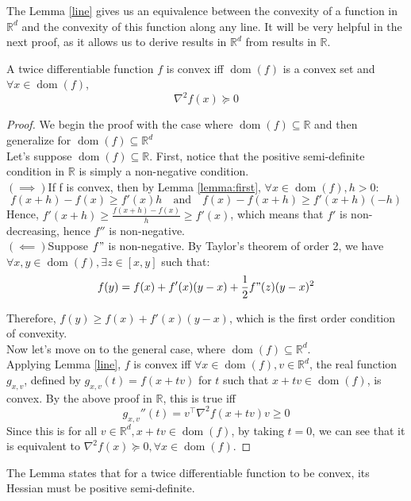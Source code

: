 \documentclass{article}
\DeclareMathOperator*{\dom}{dom}
\newcommand{\R}{\mathbb{R}}
\begin{document}
The Lemma \ref{line} gives us an equivalence between the convexity of a function in $\R^d$ and the convexity of this function along any line. It will be very helpful in the next proof, as it allows us to derive results in $\R^d$ from results in $\R$.\\

\begin{lemma}\label{second}
A twice differentiable function $f$ is convex iff $\dom(f)$ is a convex set and $\forall x\in\dom(f)$,
\[
\nabla^{2}f(x)\succeq 0
\]
\end{lemma}

\begin{proof}\cite{hall2016}
We begin the proof with the case where $\dom(f)\subseteq\R$ and then generalize for $\dom(f)\subseteq\R^d$\\

Let's suppose $\dom(f)\subseteq\R$. First, notice that the positive semi-definite condition in $\R$ is simply a non-negative condition.\\

$(\implies)$\quad If f is convex, then by Lemma \ref{lemma:first}, $\forall x\in\dom(f), h>0$:
\[
    f(x+h)-f(x)\geq f'(x)h \quad \text{and}\quad f(x)-f(x+h) \geq f'(x+h)(-h)
\]
Hence, $f'(x+h)\geq \frac{f(x+h)-f(x)}{h}\geq f'(x)$, which means that $f'$ is non-decreasing, hence $f''$ is non-negative.\\

$(\impliedby)$\quad Suppose $f"$ is non-negative. By Taylor's theorem of order 2, we have $\forall x,y \in \dom(f), \exists z\in [x,y]$ such that:
\[
    f(y)=f(x)+f'(x)(y-x)+\frac{1}{2}f"(z)(y-x)^2
\]

Therefore, $f(y)\geq f(x)+f'(x)(y-x)$, which is the first order condition of convexity.\\

Now let's move on to the general case, where $\dom(f)\subseteq\R^d$.\\

Applying Lemma \ref{line}, $f$ is convex iff $\forall x\in\dom(f),v\in\R^d$, the real function $g_{x,v}$, defined by $g_{x,v}(t)=f(x+t v)$ for $t$ such that $x+tv\in\dom(f)$, is convex.
By the above proof in $\R$, this is true iff
\[
g_{x,v}''(t)=v^\top \nabla^2f(x+tv) v \geq 0
\]
Since this is for all $v\in\R^d, x+tv \in\dom(f)$, by taking $t=0$, we can see that it is equivalent to $\nabla^2 f(x)\succeq 0, \forall x\in\dom(f)$.

\end{proof}{}
The Lemma states that for a twice differentiable function to be convex, its Hessian must be positive semi-definite.
 \\
\end{document}
